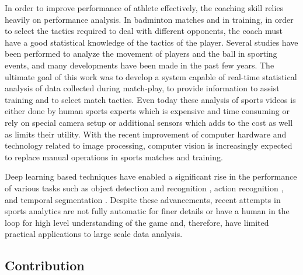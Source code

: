 \documentclass[runningheads,a4paper]{llncs}
\begin{document}
In order to improve performance of athlete effectively, the coaching skill relies heavily on performance analysis. In badminton matches and in training, in order to select the tactics required to deal with different opponents, the  coach  must have a good statistical knowledge of the tactics of the player. Several studies have been performed to analyze the movement of players and the ball in sporting events, and many developments have been made in the past few years. The ultimate goal of this work was to develop a system capable of real-time statistical analysis of data collected during match-play, to  provide information to assist training and to select match tactics. Even today these analysis of sports videos is either done by human sports experts \cite{Dartfish} which is expensive and time consuming or rely on special camera setup \cite{reno2017technology} or additional sensors \cite{mlakar2017analyzing} which adds to the cost as well as limits their utility. With the recent improvement of computer hardware and technology related to image processing, computer vision is increasingly expected to replace manual operations in sports matches and training. \par
Deep learning based techniques have enabled a significant rise in the performance of various tasks such as object detection and recognition \cite{he2016deep, redmon2016you, ren2015faster, simonyan2014very}, action recognition \cite{wang2015action}, and temporal segmentation \cite{lea2016temporal, singh2016first}. Despite these advancements, recent attempts in sports analytics are not fully automatic for finer details \cite{chu2017badminton, yan2014automatic} or have a human in the loop for high level understanding of the game \cite{Dartfish, chu2017badminton} and, therefore, have limited practical applications to large scale data analysis.

\subsection{Contribution}
\end{document}

